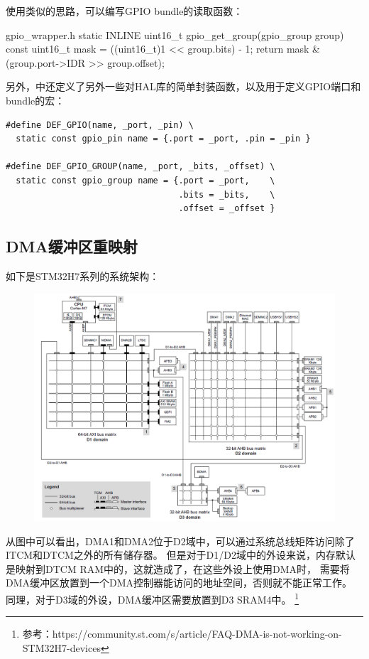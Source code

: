 使用类似的思路，可以编写GPIO bundle的读取函数：

\begin{cbox}{gpio\_wrapper.h}
static INLINE uint16_t
gpio_get_group(gpio_group group)
{
  const uint16_t mask = ((uint16_t)1 << group.bits) - 1;
  return mask & (group.port->IDR >> group.offset);
}
\end{cbox}

另外，中还定义了另外一些对HAL库的简单封装函数，以及用于定义GPIO端口和
bundle的宏：

\begin{verbatim}
#define DEF_GPIO(name, _port, _pin) \
  static const gpio_pin name = {.port = _port, .pin = _pin }

#define DEF_GPIO_GROUP(name, _port, _bits, _offset) \
  static const gpio_group name = {.port = _port,    \
                                  .bits = _bits,    \
                                  .offset = _offset }
\end{verbatim}

\subsection{DMA缓冲区重映射}
如下是STM32H7系列的系统架构：
\begin{figure}[H]
\center
  \includegraphics[width=\textwidth]{img/mem-layout.jpeg}
\end{figure}

从图中可以看出，DMA1和DMA2位于D2域中，可以通过系统总线矩阵访问除了ITCM和DTCM之外的所有储存器。
但是对于D1/D2域中的外设来说，内存默认是映射到DTCM RAM中的，这就造成了，在这些外设上使用DMA时，
需要将DMA缓冲区放置到一个DMA控制器能访问的地址空间，否则就不能正常工作。
同理，对于D3域的外设，DMA缓冲区需要放置到D3 SRAM4中。
\footnote{参考：https://community.st.com/s/article/FAQ-DMA-is-not-working-on-STM32H7-devices}

